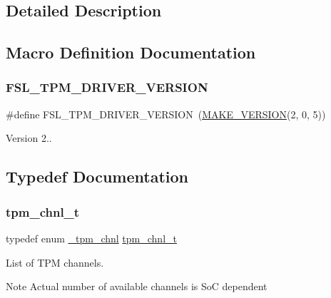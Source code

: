 \subsection{Detailed Description}


\subsection{Macro Definition Documentation}
\mbox{\label{group__tpm_ga54511b6d5433142e99df1dfd8c0816ef}} 
\subsubsection{\texorpdfstring{FSL\_TPM\_DRIVER\_VERSION}{FSL\_TPM\_DRIVER\_VERSION}}
{\footnotesize\ttfamily \#define F\+S\+L\+\_\+\+T\+P\+M\+\_\+\+D\+R\+I\+V\+E\+R\+\_\+\+V\+E\+R\+S\+I\+ON~(\mbox{\hyperlink{group__ftfx__utilities_ga812138aa3315b0c6953c1a26130bcc37}{M\+A\+K\+E\+\_\+\+V\+E\+R\+S\+I\+ON}}(2, 0, 5))}

Version 2.. 

\subsection{Typedef Documentation}
\mbox{\label{group__tpm_gacda6962369e014c8ac72d1b58b224deb}} 
\subsubsection{\texorpdfstring{tpm\_chnl\_t}{tpm\_chnl\_t}}
{\footnotesize\ttfamily typedef enum \mbox{\hyperlink{group__tpm_gacc39a4172737e2409c9b198604b1b4a4}{\+\_\+tpm\+\_\+chnl}}  \mbox{\hyperlink{group__tpm_gacda6962369e014c8ac72d1b58b224deb}{tpm\+\_\+chnl\+\_\+t}}}



List of T\+PM channels. 

\begin{DoxyNote}{Note}
Actual number of available channels is SoC dependent 
\end{DoxyNote}
\mbox{\label{group__tpm_ga5647039a18486c876df5cdeb84c9621d}} 
